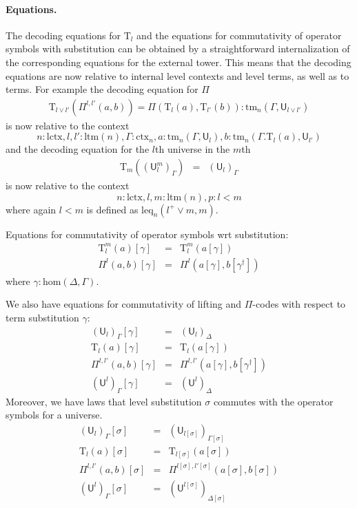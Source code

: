 \documentclass[11pt,a4paper]{article}
\theoremstyle{plain}
\theoremstyle{definition}
\newcommand{\UU}{\mathsf{U}}
\def\UU{\mathsf{U}}
\newcommand{\N}{\mathsf{N}}
\def\sub{\mathrm{hom}}
\def\lctx{\mathrm{lctx}}
\def\ltm{\mathrm{ltm}}
\def\leq{\mathrm{leq}}
\newcommand{\ctx}{\mathrm{ctx}}
\newcommand{\tm}{\mathrm{tm}}
\def\U{\mathsf{U}}
\newcommand{\Ta}{\mathrm{T}}
\begin{document}
\paragraph{Equations.}
The decoding equations for $\Ta_l$ and the equations for commutativity of operator symbols with substitution can be obtained by a straightforward internalization of the corresponding equations for the external tower. This means that the decoding equations are now relative to internal level contexts and level terms, as well as to terms. For example the decoding equation for $\Pi$
\begin{eqnarray*}
\Ta_{l \vee l'}(\Pi^{l,l'}(a,b)) = \Pi(\Ta_l(a),\Ta_{l'}(b)) :\tm_n(\Gamma,\UU_{l \vee l'})
\end{eqnarray*}
is now relative to the context
$$
n : \lctx, l, l' : \ltm(n), \Gamma : \ctx_n, a : \tm_n(\Gamma,\UU_l), b : \tm_n(\Gamma.\Ta_l(a),\UU_{l'} )
$$
and the decoding equation for the $l$th universe in the $m$th
\begin{eqnarray*}
\Ta_{m}((\UU^m_l)_\Gamma) &=& (\UU_l)_\Gamma
\end{eqnarray*}
is now relative to the context
$$
n : \lctx, l, m : \ltm(n), p : l < m
$$
where again $l < m$ is defined as $\leq_n(l^+ \vee m, m)$.

Equations for commutativity of operator symbols wrt substitution:
\begin{eqnarray*}
\Ta^m_l(a) [ \gamma ] &=& \Ta^m_l(a[ \gamma ] )\\
\Pi^{l}(a,b)[ \gamma ] &=& \Pi^{l}(a [ \gamma ], b[ \gamma^\dagger ])
\end{eqnarray*}
 where $\gamma : \sub(\Delta,\Gamma)$.

We also have equations for commutativity of lifting and $\Pi$-codes with respect to term substitution $\gamma$:
 \begin{eqnarray*}
(\U_l)_\Gamma [ \gamma ] &=& (\U_l)_\Delta\\
\Ta_l(a) [ \gamma ] &=& \Ta_l(a[ \gamma ] )\\
\Pi^{l,l'}(a,b)[ \gamma ] &=& \Pi^{l,l'}(a [ \gamma ], b[ \gamma^\dagger ])\\
(\UU^l)_\Gamma[ \gamma ] &=&(\UU^l)_\Delta
\end{eqnarray*}
Moreover, we have laws that level substitution $\sigma$ commutes with the operator symbols for a universe.
 \begin{eqnarray*}
 (\U_{l})_\Gamma[\sigma] &=& (\U_{l[\sigma]})_{\Gamma[\sigma]}\\
 \Ta_l(a) [ \sigma ] &=& \Ta_{l[\sigma]}(a[ \sigma ] )\\
\Pi^{l,l'}(a,b)[ \sigma ] &=& \Pi^{l[ \sigma ] ,l'[ \sigma ] }(a [ \sigma ], b[ \sigma])\\
(\UU^l)_\Gamma[ \sigma ] &=&(\UU^{l[ \sigma ]} )_{\Delta[ \sigma ]}
 \end{eqnarray*}
\end{document}
